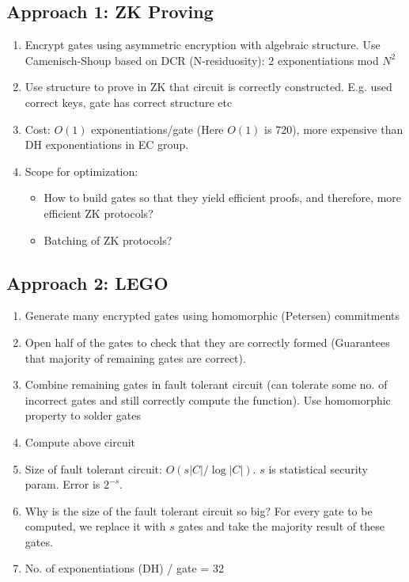 \subsection{Approach 1: ZK Proving}
\begin{enumerate}
    \item Encrypt gates using asymmetric encryption with algebraic structure. Use Camenisch-Shoup based on DCR (N-residuosity): 2 exponentiations mod $N^2$
    \item Use structure to prove in ZK that circuit is correctly constructed. E.g. used correct keys, gate has correct structure etc
    \item Cost: $O(1)$ exponentiations/gate (Here $O(1)$ is 720), more expensive than DH exponentiations in EC group.
    \item Scope for optimization:
    \begin{itemize}
        \item How to build gates so that they yield efficient proofs, and therefore, more efficient ZK protocols?
        \item Batching of ZK protocols?
    \end{itemize}
\end{enumerate}

\subsection{Approach 2: LEGO}
\begin{enumerate}
    \item Generate many encrypted gates using homomorphic (Petersen) commitments
    \item Open half of the gates to check that they are correctly formed (Guarantees that majority of remaining gates are correct). 
    \item Combine remaining gates in fault tolerant circuit (can tolerate some no. of incorrect gates and still correctly compute the function). Use homomorphic property to solder gates
    \item Compute above circuit 
    \item Size of fault tolerant circuit: $O(s|C|/\log|C|)$. $s$ is statistical security param. Error is $2^{-s}$.
    \item Why is the size of the fault tolerant circuit so big? For every gate to be computed, we replace it with $s$ gates and take the majority result of these gates.
    \item No. of exponentiations (DH) / gate = 32
\end{enumerate}

